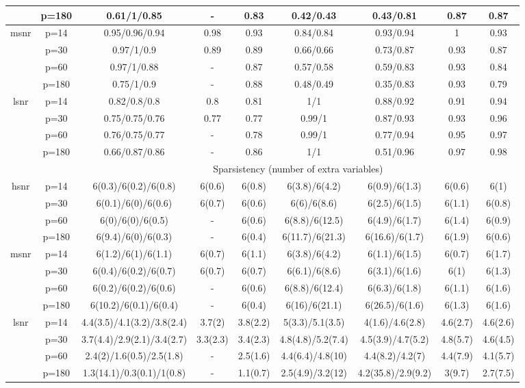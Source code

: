 \begin{table}[ht]
{\begin{tabular}{|c|c|ccccccc|}
   & p=180 & 0.61/1/0.85 & - & 0.83 & 0.42/0.43 & 0.43/0.81 & 0.87 & 0.87 \\ 
  \midrule\multirow{4}[2]{*}{msnr} & p=14 & 0.95/0.96/0.94 & 0.98 & 0.93 & 0.84/0.84 & 0.93/0.94 & 1 & 0.93 \\ 
   & p=30 & 0.97/1/0.9 & 0.89 & 0.89 & 0.66/0.66 & 0.73/0.87 & 0.93 & 0.87 \\ 
   & p=60 & 0.97/1/0.88 & - & 0.87 & 0.57/0.58 & 0.59/0.83 & 0.93 & 0.84 \\ 
   & p=180 & 0.75/1/0.9 & - & 0.88 & 0.48/0.49 & 0.35/0.83 & 0.93 & 0.79 \\ 
  \midrule\multirow{4}[2]{*}{lsnr} & p=14 & 0.82/0.8/0.8 & 0.8 & 0.81 & 1/1 & 0.88/0.92 & 0.91 & 0.94 \\ 
   & p=30 & 0.75/0.75/0.76 & 0.77 & 0.77 & 0.99/1 & 0.87/0.93 & 0.93 & 0.96 \\ 
   & p=60 & 0.76/0.75/0.77 & - & 0.78 & 0.99/1 & 0.77/0.94 & 0.95 & 0.97 \\ 
   & p=180 & 0.66/0.87/0.86 & - & 0.86 & 1/1 & 0.51/0.96 & 0.97 & 0.98 \\ 
   \midrule 
 \multicolumn{1}{|c}{} &       & \multicolumn{7}{c|}{Sparsistency (number of extra variables)} \\
\midrule\multirow{4}[2]{*}{hsnr} & p=14 & 6(0.3)/6(0.2)/6(0.8) & 6(0.6) & 6(0.8) & 6(3.8)/6(4.2) & 6(0.9)/6(1.3) & 6(0.6) & 6(1) \\ 
   & p=30 & 6(0.1)/6(0)/6(0.6) & 6(0.7) & 6(0.6) & 6(6)/6(8.6) & 6(2.5)/6(1.5) & 6(1.1) & 6(0.8) \\ 
   & p=60 & 6(0)/6(0)/6(0.5) & - & 6(0.6) & 6(8.8)/6(12.5) & 6(4.9)/6(1.7) & 6(1.4) & 6(0.9) \\ 
   & p=180 & 6(9.4)/6(0)/6(0.3) & - & 6(0.4) & 6(11.7)/6(21.3) & 6(16.6)/6(1.7) & 6(1.9) & 6(0.6) \\ 
  \midrule\multirow{4}[2]{*}{msnr} & p=14 & 6(1.2)/6(1)/6(1.1) & 6(0.7) & 6(1.1) & 6(3.8)/6(4.2) & 6(1.1)/6(1.5) & 6(0.7) & 6(1.7) \\ 
   & p=30 & 6(0.4)/6(0.2)/6(0.7) & 6(0.7) & 6(0.7) & 6(6.1)/6(8.6) & 6(3.1)/6(1.6) & 6(1) & 6(1.3) \\ 
   & p=60 & 6(0.2)/6(0.2)/6(0.6) & - & 6(0.6) & 6(8.8)/6(12.4) & 6(6.3)/6(1.8) & 6(1.1) & 6(1.6) \\ 
   & p=180 & 6(10.2)/6(0.1)/6(0.4) & - & 6(0.4) & 6(16)/6(21.1) & 6(26.5)/6(1.6) & 6(1.3) & 6(1.6) \\ 
  \midrule\multirow{4}[2]{*}{lsnr} & p=14 & 4.4(3.5)/4.1(3.2)/3.8(2.4) & 3.7(2) & 3.8(2.2) & 5(3.3)/5.1(3.5) & 4(1.6)/4.6(2.8) & 4.6(2.7) & 4.6(2.6) \\ 
   & p=30 & 3.7(4.4)/2.9(2.1)/3.4(2.7) & 3.3(2.3) & 3.4(2.3) & 4.8(4.8)/5.2(7.4) & 4.5(3.9)/4.7(5.2) & 4.8(5.7) & 4.6(4.5) \\ 
   & p=60 & 2.4(2)/1.6(0.5)/2.5(1.8) & - & 2.5(1.6) & 4.4(6.4)/4.8(10) & 4.4(8.2)/4.2(7) & 4.4(7.9) & 4.1(5.7) \\ 
   & p=180 & 1.3(14.1)/0.3(0.1)/1(0.8) & - & 1.1(0.7) & 2.5(4.9)/3.2(12) & 4.2(35.8)/2.9(9.2) & 3(9.7) & 2.7(7.5) \\ 
   \bottomrule 
\end{tabular}
}
\end{table}
